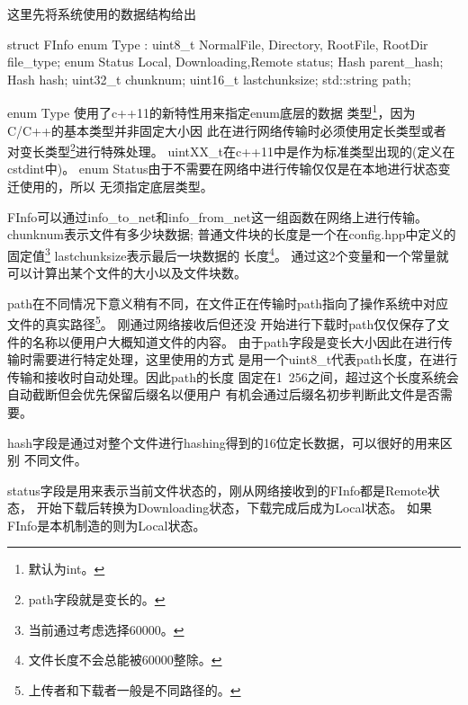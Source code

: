 这里先将系统使用的数据结构给出
\begin{cppcode}
struct FInfo {
	enum Type : uint8_t {
		NormalFile, Directory, RootFile, RootDir 
	} file_type;
	enum Status { 
		Local, Downloading,Remote 
	} status;
	Hash parent_hash;
	Hash hash;
	uint32_t chunknum;
	uint16_t lastchunksize;
	std::string path;
}
\end{cppcode}
enum Type 使用了c++11的新特性\cite{cpp11}用来指定enum底层的数据
类型\footnote{默认为int。}，因为\mbox{C/C++}的基本类型并非固定大小因
此在进行网络传输时必须使用定长类型或者
对变长类型\footnote{path字段就是变长的。}进行特殊处理。
uintXX\_t在c++11中是作为标准类型出现的(定义在cstdint中)。
enum Status由于不需要在网络中进行传输仅仅是在本地进行状态变迁使用的，所以
无须指定底层类型。

FInfo可以通过info\_to\_net和info\_from\_net这一组函数在网络上进行传输。
chunknum表示文件有多少块数据;
普通文件块的长度是一个在config.hpp中定义的
固定值\footnote{当前通过考虑选择60000。}
lastchunksize表示最后一块数据的
长度\footnote{文件长度不会总能被60000整除。}。
通过这2个变量和一个常量就可以计算出某个文件的大小以及文件块数。

path在不同情况下意义稍有不同，在文件正在传输时path指向了操作系统中对应
文件的真实路径\footnote{上传者和下载者一般是不同路径的。}。
刚通过网络接收后但还没
开始进行下载时path仅仅保存了文件的名称以便用户大概知道文件的内容。
由于path字段是变长大小因此在进行传输时需要进行特定处理，这里使用的方式
是用一个uint8\_t代表path长度，在进行传输和接收时自动处理。因此path的长度
固定在1~256之间，超过这个长度系统会自动截断但会优先保留后缀名以便用户
有机会通过后缀名初步判断此文件是否需要。

hash字段是通过对整个文件进行hashing得到的16位定长数据，可以很好的用来区别
不同文件。

status字段是用来表示当前文件状态的，刚从网络接收到的FInfo都是Remote状态，
开始下载后转换为Downloading状态，下载完成后成为Local状态。
如果FInfo是本机制造的则为Local状态。

